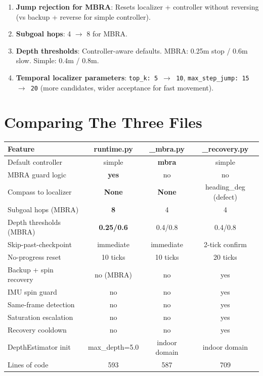 \documentclass[11pt]{article}
\begin{document}
\begin{enumerate}
\item \textbf{Jump rejection for MBRA}: Resets localizer + controller without reversing (vs backup + reverse for simple controller).

\item \textbf{Subgoal hops}: 4 $\to$ 8 for MBRA.

\item \textbf{Depth thresholds}: Controller-aware defaults. MBRA: 0.25m stop / 0.6m slow. Simple: 0.4m / 0.8m.

\item \textbf{Temporal localizer parameters}: \texttt{top\_k: 5 $\to$ 10}, \texttt{max\_step\_jump: 15 $\to$ 20} (more candidates, wider acceptance for fast movement).
\end{enumerate}


\section{Comparing The Three Files}

\begin{center}
\begin{tabular}{|l|c|c|c|}
\hline
\textbf{Feature} & \textbf{runtime.py} & \textbf{\_mbra.py} & \textbf{\_recovery.py} \\
\hline
Default controller & simple & \textbf{mbra} & simple \\
MBRA guard logic & \textbf{yes} & no & no \\
Compass to localizer & \textbf{None} & \textbf{None} & heading\_deg (defect) \\
Subgoal hops (MBRA) & \textbf{8} & 4 & 4 \\
Depth thresholds (MBRA) & \textbf{0.25/0.6} & 0.4/0.8 & 0.4/0.8 \\
Skip-past-checkpoint & immediate & immediate & 2-tick confirm \\
No-progress reset & 10 ticks & 10 ticks & 20 ticks \\
Backup + spin recovery & no (MBRA) & no & yes \\
IMU spin guard & no & no & yes \\
Same-frame detection & no & no & yes \\
Saturation escalation & no & no & yes \\
Recovery cooldown & no & no & yes \\
DepthEstimator init & max\_depth=5.0 & indoor domain & indoor domain \\
Lines of code & 593 & 587 & 709 \\
\hline
\end{tabular}
\end{center}
\end{document}
